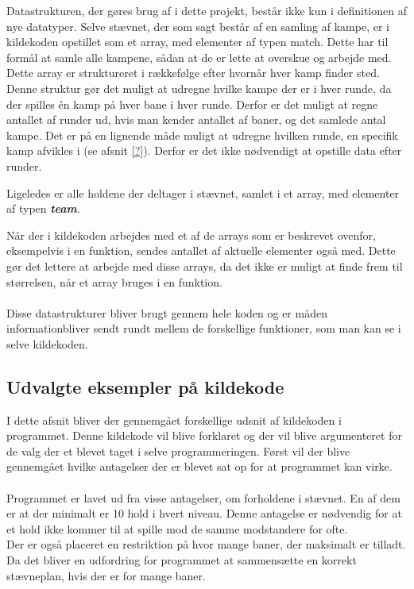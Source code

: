 Datastrukturen, der gøres brug af i dette projekt, består ikke kun i definitionen af nye datatyper. Selve stævnet, der som sagt består af en samling af kampe, er i kildekoden opstillet som et array, med elementer af typen match. Dette har til formål at samle alle kampene, sådan at de er lette at overskue og arbejde med. Dette array er struktureret i rækkefølge efter hvornår hver kamp finder sted. Denne struktur gør det muligt at udregne hvilke kampe der er i hver runde, da der spilles én kamp på hver bane i hver runde. Derfor er det muligt at regne antallet af runder ud, hvis man kender antallet af baner, og det samlede antal kampe. Det er på en lignende måde muligt at udregne hvilken runde, en specifik kamp afvikles i (se afsnit \ref{?}). Derfor er det ikke nødvendigt at opstille data efter runder.
\par
Ligeledes er alle holdene der deltager i stævnet, samlet i et array, med elementer af typen \textbf{\textit{team}}.
\par
Når der i kildekoden arbejdes med et af de arrays som er beskrevet ovenfor, eksempelvis i en funktion, sendes antallet af aktuelle elementer også med. Dette gør det lettere at arbejde med disse arrays, da det ikke er muligt at finde frem til størrelsen, når et array bruges i en funktion.
\\\\
Disse datastrukturer bliver brugt gennem hele koden og er måden informationbliver sendt rundt mellem de forskellige funktioner, som man kan se i selve kildekoden.

\subsection*{Udvalgte eksempler på kildekode}
I dette afsnit bliver der gennemgået forskellige udsnit af kildekoden i programmet. Denne kildekode vil blive forklaret og der vil blive argumenteret for de valg der et blevet taget i selve programmeringen. Først vil der blive gennemgået hvilke antagelser der er blevet sat op for at programmet kan virke.
\\\\
Programmet er lavet ud fra visse antagelser, om forholdene i stævnet. En af dem er at der minimalt er 10 hold i hvert niveau. Denne antagelse er nødvendig for at et hold ikke kommer til at spille mod de samme modstandere for ofte. 
\\
Der er også placeret en restriktion på hvor mange baner, der maksimalt er tilladt. Da det bliver en udfordring for programmet at sammensætte en korrekt stævneplan, hvis der er for mange baner.

